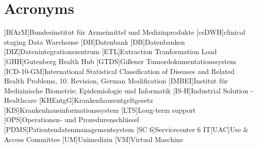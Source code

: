 \chapter*{Acronyms}
    \begin{acronym}[CDW]
    	
    	[BfArM]{Bundesinstitut für Arzneimittel und Medizinprodukte}
    	[csDWH]{clinical staging Data Warehouse}
    	[DB]{Datenbank}
	    	[DB]{Datenbanken}
    	[DIZ]{Datenintegrationszentrum} 
    	[ETL]{Extraction Tranformation Load}
    	[GHH]{Gutenberg Health Hub}
    	[GTDS]{Gißener Tumordokumentationssystem}	
    	[ICD-10-GM]{International Statistical Classification of Diseases and Related Health
    		Problems, 10. Revision, German Modification}
    	[IMBEI]{Institut für Medizinische Biometrie; Epidemiologie und Informatik}
    	[IS-H]{Industrial Solution - Healthcare}   	
		[KHEntgG]{Krankenhausentgeltgesetz}
    	[KIS]{Krankenhausinformationssystem}
    	[LTS]{Long-term support} 
    	[OPS]{Operationen- und Prozedurenschlüssel}
    	[PDMS]{Patientendatenmanagementsystem}
    	[SC 6]{Servicecenter 6 IT}[UAC]{Use \& Access Committee}
    	[UM]{Unimedizin}
    	[VM]{Virtual Maschine}
    \end{acronym}